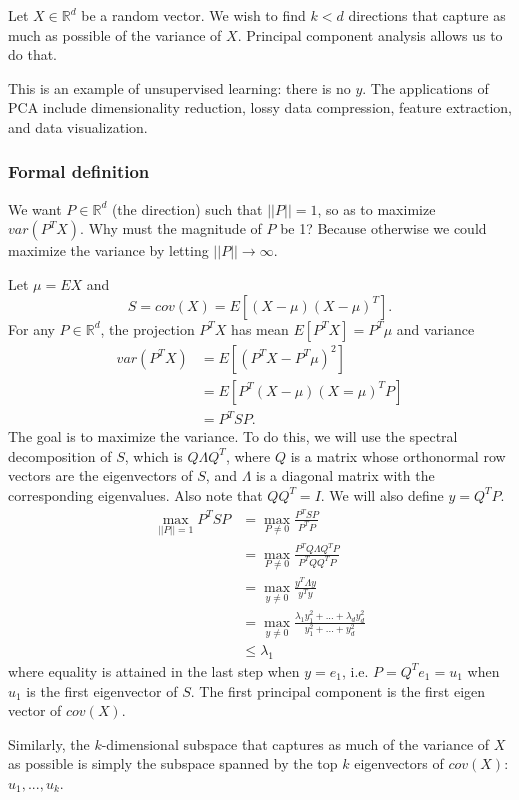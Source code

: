 \documentclass[a4paper,12pt]{article}
\begin{document}
Let $X \in \mathbb{R}^d$ be a random vector. We wish to find $k<d$ directions that capture as much as possible of the variance of $X$. Principal component analysis allows us to do that. 

This is an example of unsupervised learning: there is no $y$. The applications of PCA include dimensionality reduction, lossy data compression, feature extraction, and data visualization. 

\subsubsection{Formal definition}

We want $P\in \mathbb{R}^d$ (the direction) such that $||P|| = 1$, so as to maximize $var(P^T X)$. Why must the magnitude of $P$ be 1? Because otherwise we could maximize the variance by letting $||P||\rightarrow \infty$. 

Let $\mu = EX$ and 
$$S = cov(X) = E[(X-\mu)(X-\mu)^T].$$
For any $P \in \mathbb{R}^d$, the projection $P^TX$ has mean $E[P^TX] = P^T\mu$ and variance 
\begin{align*}
var(P^TX) &= E[(P^TX - P^T\mu)^2] \\
		  &= E[P^T(X-\mu)(X=\mu)^TP] \\
		  &= P^TSP.
\end{align*}
The goal is to maximize the variance. To do this, we will use the spectral decomposition of $S$, which is $Q\Lambda Q^T$, where $Q$ is a matrix whose orthonormal row vectors are the eigenvectors of $S$, and $\Lambda$ is a diagonal matrix with the corresponding eigenvalues. Also note that $QQ^T = I$. We will also define $y=Q^TP$. 
\begin{align*}
\max_{||P||=1} P^TSP &= \max_{P\neq 0} \frac{P^TSP}{P^TP} \\
			&= \max_{P\neq 0} \frac{P^TQ\Lambda Q^TP}{P^TQQ^TP} \\
			&= \max_{y\neq 0} \frac{y^T\Lambda y}{y^Ty} \\
			&= \max_{y\neq 0} \frac{\lambda_1y_1^2 + ... + \lambda_dy_d^2}{y_1^2 + ... + y_d^2} \\
			&\leq \lambda_1
\end{align*} 
where equality is attained in the last step when $y=e_1$, i.e. $P=Q^Te_1 = u_1$ when $u_1$ is the first eigenvector of $S$. The first principal component is the first eigen vector of $cov(X)$. 

Similarly, the $k$-dimensional subspace that captures as much of the variance of $X$ as possible is simply the subspace spanned by the top $k$ eigenvectors of $cov(X)$: $u_1, ..., u_k$. 
\end{document}
